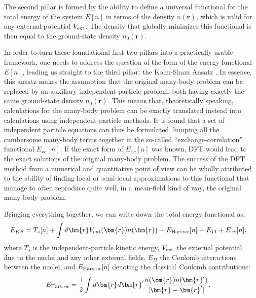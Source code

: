 The second pillar is formed by the ability to define a universal functional for the total energy of the system $E[n]$ in terms of the density $n(\bm{r})$, which is valid for any external potential $V_{\rm ext}$.
The density that globally minimizes this functional is then equal to the ground-state density $n_0(\bm{r})$.

In order to turn these foundational first two pillars into a practically usable framework, one needs to address the question of the form of the energy functional $E[n]$, leading us straight to the third pillar: the Kohn-Sham Ansatz \cite{Kohn1965}.
In essence, this ansatz makes the assumption that the original many-body problem can be replaced by an auxiliary independent-particle problem, both having exactly the same ground-state density $n_0(\bm{r})$.
This means that, theoretically speaking, calculations for the many-body problem can be exactly translated instead into calculations using independent-particle methods.
It is found that a set of independent particle equations can thus be formulated, lumping all the cumbersome many-body terms together in the so-called ``exchange-correlation'' functional $E_{xc}[n]$.
If the exact form of $E_{xc}[n]$ was known, DFT would lead to the exact solutions of the original many-body problem.
The success of the DFT method from a numerical and quantitative point of view can be wholly attributed to the ability of finding local or semi-local approximations to this functional that manage to often reproduce quite well, in a mean-field kind of way, the original many-body problem.

Bringing everything together, we can write down the total energy functional as:
\begin{equation}
	\label{eq:Rashba_kohnsham}
	E_{KS} = T_s[n] + \int d\bm{r} V_{\rm ext}(\bm{r}) n(\bm{r}) + E_{\rm Hartree}[n] + E_{II} + E_{xc}[n],
\end{equation}
where $T_s$ is the independent-particle kinetic energy, $V_{\rm ext}$ the external potential due to the nuclei and any other external fields, $E_{II}$ the Coulomb interactions between the nuclei, and $E_{\rm Hartree}[n]$ denoting the classical Coulomb contributions:
\begin{equation}
	E_{\rm Hartree} = \frac{1}{2}\int d\bm{r}d\bm{r}' \frac{n(\bm{r})n(\bm{r}')}{|\bm{r} - \bm{r}'|}.
\end{equation}

